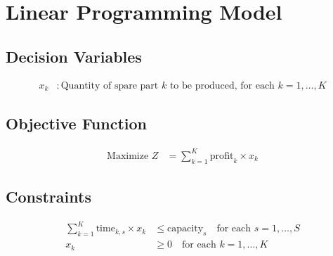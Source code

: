 \documentclass{article}
\begin{document}
\section*{Linear Programming Model}

\subsection*{Decision Variables}
\begin{align*}
x_k & : \text{Quantity of spare part } k \text{ to be produced, for each } k = 1, \ldots, K
\end{align*}

\subsection*{Objective Function}
\begin{align*}
\text{Maximize } Z & = \sum_{k=1}^{K} \text{profit}_k \times x_k
\end{align*}

\subsection*{Constraints}
\begin{align*}
\sum_{k=1}^{K} \text{time}_{k,s} \times x_k & \leq \text{capacity}_s \quad \text{for each } s = 1, \ldots, S \\
x_k & \geq 0 \quad \text{for each } k = 1, \ldots, K
\end{align*}
\end{document}
